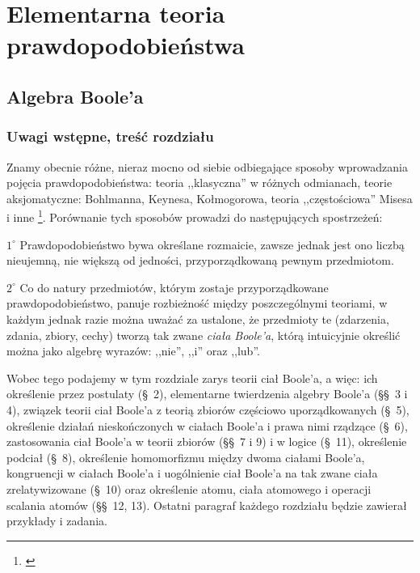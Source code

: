 \documentclass[12 pt, a4paper, leqno]{book}
\numberwithin{equation}{section}
\begin{document}
\part{Elementarna teoria prawdopodobieństwa}
\chapter{Algebra Boole'a}

\section{Uwagi wstępne, treść rozdziału} \label{sec:wstep}
Znamy obecnie różne, nieraz mocno od siebie odbiegające sposoby wprowadzania pojęcia 
prawdopodobieństwa: teoria ,,klasyczna'' w różnych odmianach, teorie aksjomatyczne:
 {\selectfont Bohlmanna, Keynesa, Kołmogorowa}, teoria ,,częstościowa''
{\selectfont Misesa} i inne \footnote{\cite{bohlmann1} \cite{keynes1} \cite{kolmogoroff1} \cite{mises1}}. 
Porównanie tych sposobów prowadzi do następujących spostrzeżeń:

$1^\circ$ Prawdopodobieństwo bywa określane rozmaicie, zawsze jednak jest ono liczbą nieujemną,
            nie większą od jedności, przyporządkowaną pewnym przedmiotom.

$2^\circ$ Co do natury przedmiotów, którym zostaje przyporządkowane prawdopodobieństwo, panuje rozbieżność
            między poszczególnymi teoriami, w każdym jednak razie można uważać za ustalone, że przedmioty 
            te (zdarzenia, zdania, zbiory, cechy) tworzą tak zwane \textit{ciała Boole'a}, którą
            intuicyjnie określić można jako algebrę wyrazów: ,,nie'', ,,i'' oraz ,,lub''.

Wobec tego podajemy w tym rozdziale zarys teorii ciał Boole'a, a więc: ich określenie
przez postulaty (\S\ 2), elementarne twierdzenia algebry Boole'a (\S\S\ 3 i 4), związek teorii ciał Boole'a
z teorią zbiorów częściowo uporządkowanych (\S\ 5), określenie działań nieskończonych w ciałach Boole'a i prawa nimi rządzące (\S\ 6),
zastosowania ciał Boole'a w teorii zbiorów (\S\S\ 7 i 9) i w logice (\S\ 11), określenie podciał (\S\ 8), 
określenie homomorfizmu między dwoma ciałami Boole'a, kongruencji w ciałach Boole'a i uogólnienie ciał Boole'a na tak zwane
ciała zrelatywizowane (\S\ 10) oraz określenie atomu, ciała atomowego i operacji scalania
atomów (\S\S\ 12, 13). Ostatni paragraf każdego rozdziału będzie zawierał przykłady i zadania.
\end{document}
